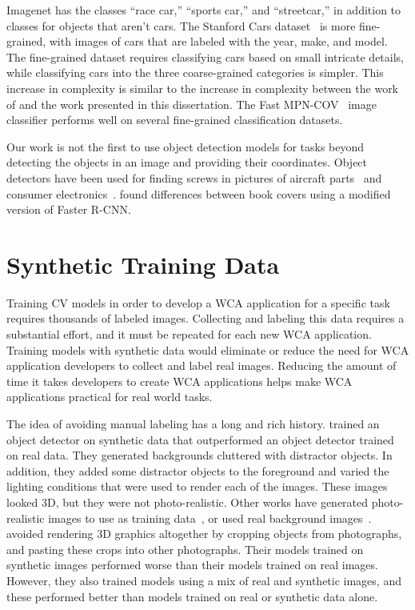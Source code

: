 Imagenet has the classes ``race car,'' ``sports car,'' and ``streetcar,''
in addition to classes for objects that aren't cars.
The Stanford Cars dataset~\cite{KrauseStarkDengFei-Fei_3DRR2013} is more
fine-grained, with images of cars that are labeled with the year, make, and
model.
The fine-grained dataset requires classifying cars based on small intricate
details, while classifying cars into the three coarse-grained categories is
simpler.
This increase in complexity is similar to the increase in complexity between
the work of \citet{chen2017} and the work presented in this dissertation.
The Fast MPN-COV~\cite{Li_2018_CVPR} image classifier performs
well on several fine-grained classification datasets.

Our work is not the first to use object detection models for tasks beyond
detecting the objects in an image and providing their coordinates.
Object detectors have been used for finding screws in pictures of aircraft
parts~\cite{visapp19} and consumer electronics~\cite{FOO2021666}.
\citet{wu2018spot} found differences between book covers using a modified
version of Faster R-CNN.

\section{Synthetic Training Data}

Training CV models in order to develop a WCA application for a specific task
requires thousands of labeled images.
Collecting and labeling this data requires a substantial effort, and it must be
repeated for each new WCA application.
Training models with synthetic data would eliminate or reduce the need for
WCA application developers to collect and label real images.
Reducing the amount of time it takes developers to create WCA applications helps
make WCA applications practical for real world tasks.

The idea of avoiding manual labeling has a long and rich history.
\citet{synthetic} trained an object detector on synthetic data that
outperformed an object detector trained on real data. They generated backgrounds
cluttered with distractor objects. In addition, they added some distractor
objects to the foreground and varied the lighting conditions that were used to
render each of the images. These images looked 3D, but they were not
photo-realistic. Other works have generated photo-realistic images to use as
training data~\cite{DBLP:journals/corr/abs-1809-10790, photo2}, or used real
background images~\cite{real_background1, real_background2, real_background3}.
\citet{dwibedi} avoided rendering 3D graphics altogether by cropping objects
from photographs, and pasting these crops into other photographs.
Their models trained on synthetic images performed worse than their models
trained on real images.
However, they also trained models using a mix of real and synthetic images, and
these performed better than models trained on real or synthetic data alone.

